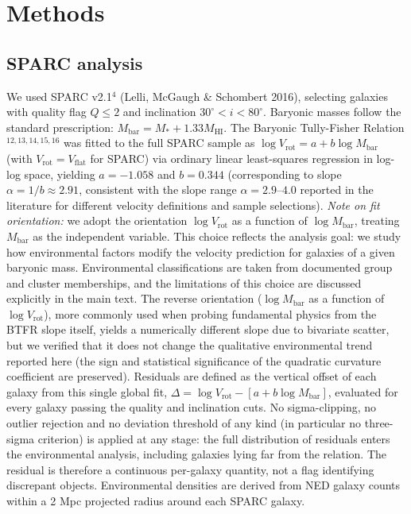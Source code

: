 \documentclass[11pt,a4paper]{article}
\begin{document}
\section*{Methods}

\subsection*{SPARC analysis}
We used SPARC v2.1$^{4}$ (Lelli, McGaugh \& Schombert 2016), selecting galaxies with quality flag $Q \leq 2$ and inclination $30^\circ < i < 80^\circ$. Baryonic masses follow the standard prescription: $M_{\mathrm{bar}} = M_* + 1.33 M_{\mathrm{HI}}$. The Baryonic Tully-Fisher Relation$^{12,13,14,15,16}$ was fitted to the full SPARC sample as $\log V_{\mathrm{rot}} = a + b \log M_{\mathrm{bar}}$ (with $V_{\mathrm{rot}} = V_{\mathrm{flat}}$ for SPARC) via ordinary linear least-squares regression in log-log space, yielding $a = -1.058$ and $b = 0.344$ (corresponding to slope $\alpha = 1/b \approx 2.91$, consistent with the slope range $\alpha = 2.9$--$4.0$ reported in the literature for different velocity definitions and sample selections). \textit{Note on fit orientation:} we adopt the orientation $\log V_{\mathrm{rot}}$ as a function of $\log M_{\mathrm{bar}}$, treating $M_{\mathrm{bar}}$ as the independent variable. This choice reflects the analysis goal: we study how environmental factors modify the velocity prediction for galaxies of a given baryonic mass. Environmental classifications are taken from documented group and cluster memberships, and the limitations of this choice are discussed explicitly in the main text. The reverse orientation ($\log M_{\mathrm{bar}}$ as a function of $\log V_{\mathrm{rot}}$), more commonly used when probing fundamental physics from the BTFR slope itself, yields a numerically different slope due to bivariate scatter, but we verified that it does not change the qualitative environmental trend reported here (the sign and statistical significance of the quadratic curvature coefficient are preserved). Residuals are defined as the vertical offset of each galaxy from this single global fit, $\Delta = \log V_{\mathrm{rot}} - [a + b \log M_{\mathrm{bar}}]$, evaluated for every galaxy passing the quality and inclination cuts. No sigma-clipping, no outlier rejection and no deviation threshold of any kind (in particular no three-sigma criterion) is applied at any stage: the full distribution of residuals enters the environmental analysis, including galaxies lying far from the relation. The residual is therefore a continuous per-galaxy quantity, not a flag identifying discrepant objects. Environmental densities are derived from NED galaxy counts within a 2 Mpc projected radius around each SPARC galaxy.
\end{document}
